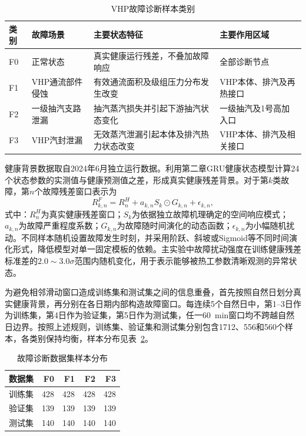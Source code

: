 \begin{table}[htbp]
    \centering
    \caption{VHP故障诊断样本类别}
    \label{tab:fault_classes_v6}
    \begin{tabular}{p{1.0cm}p{4.2cm}p{5.2cm}p{3.3cm}}
        \toprule
        类别 & 故障场景 & 主要状态特征 & 主要作用区域 \\
        \midrule
        F0 & 正常状态 & 真实健康运行残差，不叠加故障响应 & 全部诊断节点 \\
        F1 & VHP通流部件侵蚀 & 有效通流面积及级组压力分布发生改变 & VHP本体、排汽及再热接口 \\
        F2 & 一级抽汽支路泄漏 & 抽汽蒸汽损失并引起下游抽汽状态变化 & 一级抽汽及1号高加入口 \\
        F3 & VHP汽封泄漏 & 无效蒸汽泄漏引起本体及排汽热力状态改变 & VHP本体、排汽及相关接口 \\
        \bottomrule
    \end{tabular}
\end{table}

健康背景数据取自2024年6月独立运行数据。利用第二章GRU健康状态模型计算24个状态参数的实测值与健康预测值之差，形成真实健康残差背景。对于第$k$类故障，第$n$个故障残差窗口表示为
\begin{equation}
R_{k,n}^{F}=R_n^{H}+a_{k,n}S_k\odot G_{k,n}+\epsilon_{k,n},
\end{equation}
式中：$R_n^{H}$为真实健康残差窗口；$S_k$为依据独立故障机理确定的空间响应模式；$a_{k,n}$为故障严重程度系数；$G_{k,n}$为故障随时间演化的动态函数；$\epsilon_{k,n}$为小幅随机扰动。不同样本随机设置故障发生时刻，并采用阶跃、斜坡或Sigmoid等不同时间演化形式，降低模型对单一固定模板的依赖。主实验中故障扰动强度在训练健康残差标准差的$2.0\sim3.0\sigma$范围内随机变化，用于表示能够被热工参数清晰观测的异常状态。

为避免相邻滑动窗口造成训练集和测试集之间的信息重叠，首先按照自然日划分真实健康背景，再分别在各日期内部构造故障窗口。每连续5个自然日中，第1--3日作为训练集，第4日作为验证集，第5日作为测试集，任一60~min窗口均不跨越自然日边界。按照上述规则，训练集、验证集和测试集分别包含1712、556和560个样本，各类别保持均衡，样本分布见表~\ref{tab:fault_split_v6}。

\begin{table}[htbp]
    \centering
    \caption{故障诊断数据集样本分布}
    \label{tab:fault_split_v6}
    \begin{tabular}{lrrrr}
        \toprule
        数据集 & F0 & F1 & F2 & F3 \\
        \midrule
        训练集 & 428 & 428 & 428 & 428 \\
        验证集 & 139 & 139 & 139 & 139 \\
        测试集 & 140 & 140 & 140 & 140 \\
        \bottomrule
    \end{tabular}
\end{table}

